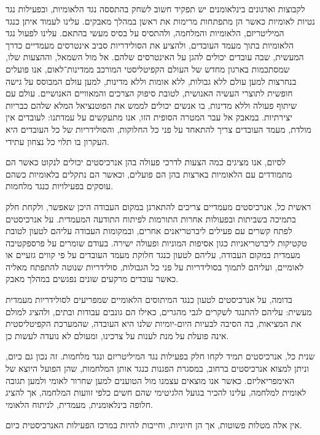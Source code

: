 לקבוצות וארגונים בינלאומנים יש תפקיד חשוב לשחק בהתססה נגד הלאומיות, ובפעילות נגד נטיות לאומיות כאשר הן מתפתחות מרימות את ראשן במהלך מאבקים. עלינו לעמוד איתן כנגד המיליטריזם, הלאומיות והמלחמה, ולהתסיס על בסיס מעשי בהתאם. עלינו לפעול נגד הלאומיות בתוך מעמד העובדים, ולהציע את הסולידריות סביב אינטרסים מעמדיים כדרך המעשית, שבה עובדים יכולים להגן על האינטרסים שלהם. אל מול השמאל, וההצעות שלו, שמסתכמות בארגון מחדש של העולם הקפיטליסטי המורכב ממדינות־לאום, אנו פועלים בנחרצות למען עולם ללא גבולות, ללא אומות וללא מדינות, למען עולם המבוסס על גישה חופשית לתוצרי העשיה האנושית, לטובת סיפוק הצרכים והמאוויים האנושיים. עולם עם שיתוף פעולה וללא מדינות, בו אנשים יכולים לממש את הפוטנציאל המלא שלהם כבריות יצירתיות. במאבק אל עבר המטרה הסופית הזו, אנו מתעקשים על עמדתנו: לעובדים אין מולדת, מעמד העובדים צריך להתאחד על פני כל החלוקות, והסולידריות של כל העובדים היא העקרון בו תלוי כל נצחון עתידי.

לסיום, אנו מציגים כמה הצעות לדרכי פעולה בהן אנרכיסטים יכולים לנקוט כאשר הם מתמודדים עם הלאומיות בארצות בהן הם פועלים, וכאשר הם נתקלים בלאומיות כשהם עוסקים בפעילויות כנגד מלחמות.

ראשית כל, אנרכיסטים מעמדיים צריכים להתארגן במקום העבודה היכן שאפשר, ולקחת חלק בתמיכה בשביתות ובפעולות אחרות התורמות לפיתוח התודעה המעמדית. על אנרכיסטים לפתח קשרים עם פעילים ליברטריאנים אחרים, ובמקומות העבודה עליהם לטעון לטובת טקטיקות ליברטריאניות כגון אסיפות המוניות ופעולה ישירה. בעודם שומרים על פרספקטיבה מעמדית במקום העבודה, עליהם לטעון כנגד חלוקת מעמד העובדים על פי קווים גזעיים או לאומיים, ועליהם לתמוך בסולידריות על פני כל הגבולות, סולידריות שנוטה להתפתח מאליה כאשר עובדים מרקעים שונים נפגשים במהלך מאבק.

בדומה, על אנרכיסטים לטעון כנגד המיתוסים הלאומיים שמפריעים לסולידריות מעמדית מעשית: עליהם להתנגד לשקרים לגבי מהגרים, כאילו הם גונבים עבודות ובתים, ולהציג למולם את המציאות, בה הסיבה לבעיות היום-יומיות שלנו היא העובדה, שהמערכת הקפיטליסטית אינה פועלת על מנת לענות על צרכינו, ומעולם לא נועדה לעשות כן.

שנית כל, אנרכיסטים תמיד לקחו חלק בפעילות נגד המיליטריזם ונגד מלחמות. זה נכון גם כיום, וניתן למצוא אנרכיסטים ברחוב, במסגרת הפגנות כנגד אותן המלחמות, שהן הפועל היוצא של האימפריאליזם. כאשר אנו מוצאים עצמנו מול הטוענים למען שחרור לאומי ולמען תגובה לאומית למלחמה, עלינו להכיר בגועל הלגיטימי שהם חשים כלפי זוועות המלחמה, אך להציג חלופה בינלאומנית, מעמדית, לניתוח הלאומי.

אין אלה מטלות פשוטות, אך הן חיוניות, וחייבות להיות במרכז הפעילות האנרכיסטית כיום.



